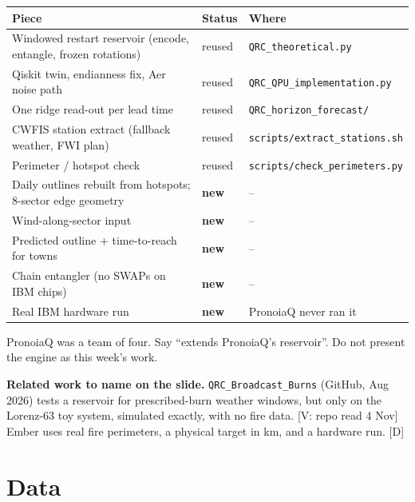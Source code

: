 \documentclass[11pt,a4paper]{article}
\newcommand{\tagbox}[2]{{\footnotesize\color{#1}\textsf{[#2]}}}
\newcommand{\veri}[1]{\tagbox{ForestGreen!70!black}{V: #1}}  %
\newcommand{\ours}{\tagbox{NavyBlue}{D}}                      %
\newcommand{\code}[1]{\texttt{\small #1}}
\begin{document}
\begin{center}\small
\begin{tabularx}{\linewidth}{@{}Y l l@{}}
\toprule
\textbf{Piece} & \textbf{Status} & \textbf{Where}\\
\midrule
Windowed restart reservoir (encode, entangle, frozen rotations) & reused & \code{QRC\_theoretical.py}\\
Qiskit twin, endianness fix, Aer noise path & reused & \code{QRC\_QPU\_implementation.py}\\
One ridge read-out per lead time & reused & \code{QRC\_horizon\_forecast/}\\
CWFIS station extract (fallback weather, FWI plan) & reused & \code{scripts/extract\_stations.sh}\\
Perimeter / hotspot check & reused & \code{scripts/check\_perimeters.py}\\
Daily outlines rebuilt from hotspots; 8-sector edge geometry & \textbf{new} & --\\
Wind-along-sector input & \textbf{new} & --\\
Predicted outline + time-to-reach for towns & \textbf{new} & --\\
Chain entangler (no SWAPs on IBM chips) & \textbf{new} & --\\
Real IBM hardware run & \textbf{new} & PronoiaQ never ran it\\
\bottomrule
\end{tabularx}
\end{center}

\begin{watch}
PronoiaQ was a team of four. Say ``extends PronoiaQ's reservoir''. Do not present the engine as this week's work.
\end{watch}

\textbf{Related work to name on the slide.} \code{QRC\_Broadcast\_Burns} (GitHub, Aug 2026) tests a reservoir for
prescribed-burn weather windows, but only on the Lorenz-63 toy system, simulated exactly, with no fire data.
\veri{repo read 4 Nov} Ember uses real fire perimeters, a physical target in km, and a hardware run. \ours

\section{Data}
\end{document}
